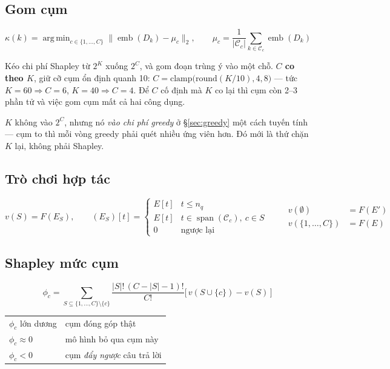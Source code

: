 \documentclass[11pt,a4paper]{article}
\DeclareMathOperator*{\argmin}{arg\,min}
\DeclareMathOperator{\spanop}{span}
\DeclareMathOperator{\emb}{emb}
\begin{document}
\subsection{Gom cụm}

\[
\kappa(k)=\argmin_{c\in\{1,\dots,C\}}\big\lVert \emb(D_k)-\mu_c\big\rVert_2,
\qquad
\mu_c=\frac{1}{|\mathcal{C}_c|}\sum_{k\in\mathcal{C}_c}\emb(D_k)
\]

Kéo chi phí Shapley từ $2^K$ xuống $2^C$, và gom đoạn trùng ý vào một chỗ. \textbf{$C$ co
theo $K$}, giữ cỡ cụm ổn định quanh 10: $C=\mathrm{clamp}\big(\mathrm{round}(K/10),4,8\big)$
--- tức $K=60\Rightarrow C=6$, $K=40\Rightarrow C=4$. Để $C$ cố định mà $K$ co lại thì cụm
còn 2--3 phần tử và việc gom cụm mất cả hai công dụng.

$K$ không vào $2^C$, nhưng nó \emph{vào chi phí greedy} ở \S\ref{sec:greedy} một cách tuyến
tính --- cụm to thì mỗi vòng greedy phải quét nhiều ứng viên hơn. Đó mới là thứ chặn $K$
lại, không phải Shapley.

\subsection{Trò chơi hợp tác}

\[
v(S)=F(E_S),\qquad
(E_S)[t]=\begin{cases}
E[t] & t\le n_q\\
E[t] & t\in\spanop(\mathcal{C}_c),\ c\in S\\
0 & \text{ngược lại}
\end{cases}
\qquad
\begin{aligned}
v(\emptyset)&=F(E')\\
v(\{1,\dots,C\})&=F(E)
\end{aligned}
\]

\subsection{Shapley mức cụm}

\[
\phi_c=\sum_{S\subseteq\{1,\dots,C\}\setminus\{c\}}
\frac{|S|!\,(C-|S|-1)!}{C!}\Big[\,v(S\cup\{c\})-v(S)\,\Big]
\]

\begin{center}
\begin{tabular}{@{}ll@{}}
\toprule
$\phi_c$ lớn dương & cụm đóng góp thật \\
$\phi_c\approx 0$ & mô hình bỏ qua cụm này \\
$\phi_c<0$ & cụm \emph{đẩy ngược} câu trả lời \\
\bottomrule
\end{tabular}
\end{center}
\end{document}
